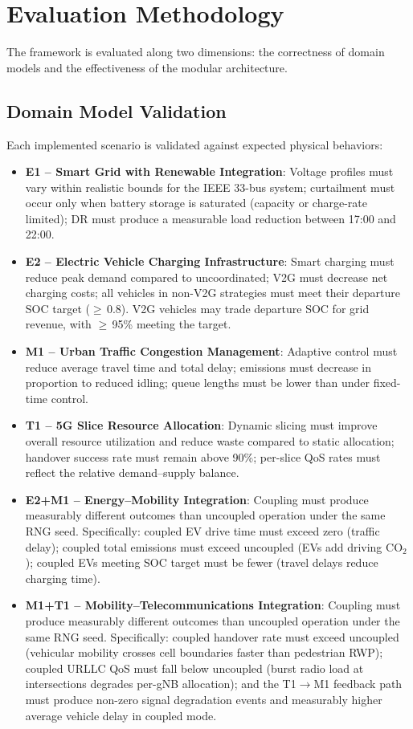 \section{Evaluation Methodology}

The framework is evaluated along two dimensions: the correctness of domain models and the effectiveness of the modular architecture.

\subsection{Domain Model Validation}

Each implemented scenario is validated against expected physical behaviors:

\begin{itemize}
    \item \textbf{E1 -- Smart Grid with Renewable Integration}: Voltage profiles must vary within realistic bounds for the IEEE 33-bus system; curtailment must occur only when battery storage is saturated (capacity or charge-rate limited); DR must produce a measurable load reduction between 17:00 and 22:00.
    \item \textbf{E2 -- Electric Vehicle Charging Infrastructure}: Smart charging must reduce peak demand compared to uncoordinated; V2G must decrease net charging costs; all vehicles in non-V2G strategies must meet their departure SOC target ($\geq$\,0.8). V2G vehicles may trade departure SOC for grid revenue, with $\geq$\,95\% meeting the target.
    \item \textbf{M1 -- Urban Traffic Congestion Management}: Adaptive control must reduce average travel time and total delay; emissions must decrease in proportion to reduced idling; queue lengths must be lower than under fixed-time control.
    \item \textbf{T1 -- 5G Slice Resource Allocation}: Dynamic slicing must improve overall resource utilization and reduce waste compared to static allocation; handover success rate must remain above 90\%; per-slice QoS rates must reflect the relative demand--supply balance.
    \item \textbf{E2+M1 -- Energy--Mobility Integration}: Coupling must produce measurably different outcomes than uncoupled operation under the same RNG seed. Specifically: coupled EV drive time must exceed zero (traffic delay); coupled total emissions must exceed uncoupled (EVs add driving CO$_2$); coupled EVs meeting SOC target must be fewer (travel delays reduce charging time).
    \item \textbf{M1+T1 -- Mobility--Telecommunications Integration}: Coupling must produce measurably different outcomes than uncoupled operation under the same RNG seed. Specifically: coupled handover rate must exceed uncoupled (vehicular mobility crosses cell boundaries faster than pedestrian RWP); coupled URLLC QoS must fall below uncoupled (burst radio load at intersections degrades per-gNB allocation); and the T1$\rightarrow$M1 feedback path must produce non-zero signal degradation events and measurably higher average vehicle delay in coupled mode.
\end{itemize}


